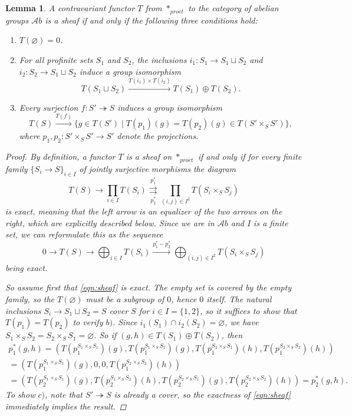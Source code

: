 \documentclass[11pt,A4]{article}
\theoremstyle{plain}
\newtheorem{lm}[thm]{Lemma}
\theoremstyle{definition}
\theoremstyle{remark}
\newcommand{\Ab}{\mathscr{A}b}
\newcommand{\pe}{*_{pro\acute et}}
\newcommand{\op}{\oplus}
\begin{document}
\begin{lm}\label{lm:sheaf}
    A contravariant functor $T$ from $\pe$ to the category of abelian groups $\Ab$ is a sheaf if and only if the following three conditions hold:
    \begin{enumerate}[label=\alph*)]
	\item $T(\varnothing)=0$.
	\item For all profinite sets $S_{1}$ and $S_{2}$, the inclusions $i_{1}\colon S_{1}\to S_{1}\sqcup S_{2}$ and $i_{2}\colon S_{2}\to S_{1}\sqcup S_{2}$ induce a group isomorphism
	    \[ T(S_{1}\sqcup S_{2})\xrightarrow{T(i_{1})\times T(i_{2})} T(S_{1})\op T(S_{2}).\]
	\item Every surjection $f\colon S'\twoheadrightarrow S$ induces a group isomorphism
	    \[ T(S)\xrightarrow{T(f)} \{ g\in T(S') \mid T(p_{1})(g)=T(p_{2})(g) \in T(S'\times_{S}S') \}, \]
	    where $p_{1},p_{2}\colon S'\times_{S}S'\to S'$ denote the projections.
    \end{enumerate}
    \begin{proof}
	By definition, a functor $T$ is a sheaf on $\pe$ if and only if for every finite family $\{ S_{i}\to S\}_{i\in I}$ of jointly surjective morphisms the diagram
	\[ T(S)\to \prod_{i\in I} T(S_{i})\overset{p_{1}^{*}}{\underset{p_{2}^{*}}{\rightrightarrows}}\prod_{(i,j)\in I^{2}} T(S_{i}\times_{S} S_{j}) \]
	is exact, meaning that the left arrow is an equalizer of the two arrows on the right, which are explicitly described below.
	Since we are in $\Ab$ and $I$ is a finite set, we can reformulate this as the sequence
	\begin{equation}\label{eqn:sheaf}
	    0\to T(S)\to \bigoplus_{i\in I} T(S_{i})\xrightarrow{p_{1}^{*}-p_{2}^{*}} \bigoplus_{(i,j)\in I^{2}} T(S_{i}\times_{S}S_{j})
	\end{equation}
	being exact.

	So assume first that \ref{eqn:sheaf} is exact.
	The empty set is covered by the empty family, so the $T(\varnothing)$ must be a subgroup of $0$, hence $0$ itself.
	The natural inclusions $S_{i}\to S_{1}\sqcup S_{2}=S$ cover $S$ for $i\in I=\{1,2\}$, so it suffices to show that $T(p_{1})=T(p_{2})$ to verify $b)$.
	Since $i_{1}(S_{1})\cap i_{2}(S_{2})=\varnothing $, we have $S_{1}\times_{S}S_{2}=S_{2}\times_{S}S_{1}=\varnothing $.
	So if $(g,h)\in T(S_{1})\op T(S_{2})$, then
	\begin{multline*}
	    p_{1}^{*}(g,h)=(T(p_{1}^{S_{1}\times_{S}S_{1}})(g),T(p_{1}^{S_{1}\times_{S}S_{2}})(g),T(p_{1}^{S_{2}\times_{S}S_{1}})(h),T(p_{1}^{S_{2}\times_{S}S_{2}})(h)) \\ 
	    =(T(p_{1}^{S_{1}\times_{S}S_{1}})(g),0,0,T(p_{1}^{S_{2}\times_{S}S_{2}})(h)) \\
	    =(T(p_{2}^{S_{1}\times_{S}S_{1}})(g),T(p_{2}^{S_{1}\times_{S}S_{2}})(h),T(p_{2}^{S_{2}\times_{S}S_{1}})(g),T(p_{2}^{S_{2}\times_{S}S_{2}})(h))=p_{2}^{*}(g,h).
	\end{multline*}
	To show $c)$, note that $S'\twoheadrightarrow S$ is already a cover, so the exactness of \ref{eqn:sheaf} immediately implies the result.


\end{proof}
\end{lm}
\end{document}
